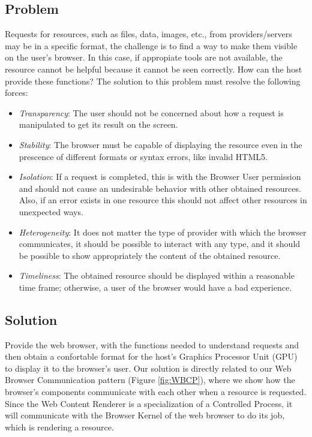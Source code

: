 \documentclass[prodmode,acmtecs]{acmsmall}
\begin{document}
  \subsection*{Problem}
  Requests for resources, such as files, data, images, etc., from providers/servers may be in a specific format, the challenge is to find a way to make them visible on the user's browser. In this case, if appropiate tools are not available, the resource cannot be helpful because it cannot be seen correctly. How can the host provide these functions? The solution to this problem must resolve the following forces:
  \begin{itemize}\leftskip0.8em
    \item \textit{Transparency}: The user should not be concerned about how a request is manipulated to get its result on the screen.
    \item \textit{Stability}: The browser must be capable of displaying the resource even in the prescence of different formats or syntax errors, like invalid HTML5.
    \item \textit{Isolation}: If a request is completed, this is with the Browser User permission and should not cause an undesirable behavior with other obtained resources. Also, if an error exists in one resource this should not affect other resources in unexpected ways.
    \item \textit{Heterogeneity}: It does not matter the type of provider with which the browser communicates, it should be possible to interact with any type, and it should be possible to show appropriately the content of the obtained resource.
    \item \textit{Timeliness}: The obtained resource should be displayed within a reasonable time frame; otherwise, a user of the browser would have a bad experience.
  \end{itemize}

  \subsection*{Solution}
  Provide the web browser, with the functions needed to understand requests and then obtain a confortable format for the host's Graphics Processor Unit (GPU) to display it to the browser's user. Our solution is directly related to our Web Browser Communication pattern \cite{silva2015} (Figure \ref{fig:WBCP}), where we show how the browser's components communicate with each other when a resource is requested. Since the Web Content Renderer is a specialization of a Controlled Process, it will communicate with the Browser Kernel of the web browser to do its job, which is rendering a resource.
\end{document}
